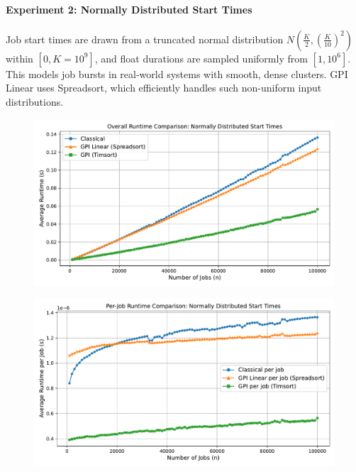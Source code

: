 \documentclass[final,5p,times]{elsarticle}
\begin{document}
\paragraph{Experiment 2: Normally Distributed Start Times}
Job start times are drawn from a truncated normal distribution $N\left(\frac{K}{2}, \left(\frac{K}{10}\right)^2\right)$ within $[0, K=10^9]$, and float durations are sampled uniformly from $[1, 10^6]$. This models job bursts in real-world systems with smooth, dense clusters. GPI Linear uses Spreadsort, which efficiently handles such non-uniform input distributions.
\vspace{-1em}
\begin{figure}[H]
    \centering
    \includegraphics[width=1\linewidth]{figures/Normally_Distributed_Start_Times_runtime_total.pdf}
    \label{fig:exp2-runtime-total}
\end{figure}
\vspace{-2.5em}
\begin{figure}[H]
    \includegraphics[width=1\linewidth]{figures/Normally_Distributed_Start_Times_runtime_per_job.pdf}
    \label{fig:exp2-runtime-per-job}
\end{figure}
\vspace{-2em}
\end{document}
